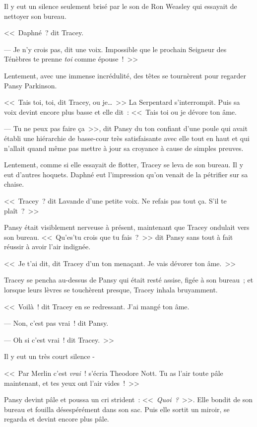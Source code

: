 Il y eut un silence seulement brisé par le son de Ron Weasley qui essayait de nettoyer son bureau.

<<~Daphné~? dit Tracey.

--- Je n'y crois pas, dit une voix. Impossible que le prochain Seigneur des Ténèbres te prenne \emph{toi} comme épouse~!~>>

Lentement, avec une immense incrédulité, des têtes se tournèrent pour regarder Pansy Parkinson.

<<~Tais toi, toi, dit Tracey, ou je…~>> La Serpentard s'interrompit. Puis sa voix devint encore plus basse et elle dit~: <<~Tais toi ou je dévore ton âme.

--- Tu ne peux pas faire ça~>>, dit Pansy du ton confiant d'une poule qui avait établi une hiérarchie de basse-cour très satisfaisante avec elle tout en haut et qui n'allait quand même pas mettre à jour sa croyance à cause de simples preuves.

Lentement, comme si elle essayait de flotter, Tracey se leva de son bureau. Il y eut d'autres hoquets. Daphné eut l'impression qu'on venait de la pétrifier sur sa chaise.

<<~Tracey~? dit Lavande d'une petite voix. Ne refais pas tout ça. S'il te plaît~?~>>

Pansy était visiblement nerveuse à présent, maintenant que Tracey ondulait vers son bureau. <<~Qu'es'tu crois que tu fais~?~>> dit Pansy sans tout à fait réussir à avoir l'air indignée.

<<~Je t'ai dit, dit Tracey d'un ton menaçant. Je vais dévorer ton âme.~>>

Tracey se pencha au-dessus de Pansy qui était resté assise, figée à son bureau~; et lorsque leurs lèvres se touchèrent presque, Tracey inhala bruyamment.

<<~Voilà~! dit Tracey en se redressant. J'ai mangé ton âme.

--- Non, c'est pas vrai~! dit Pansy.

--- Oh si c'est vrai~! dit Tracey.~>>

Il y eut un très court silence -

<<~Par Merlin c'est \emph{vrai}~! s'écria Theodore Nott. Tu as l'air toute pâle maintenant, et tes yeux ont l'air vides~!~>>

Pansy devint pâle et poussa un cri strident~: <<~\emph{Quoi~?}~>>. Elle bondit de son bureau et fouilla désespérément dans son sac. Puis elle sortit un miroir, se regarda et devint encore plus pâle.


